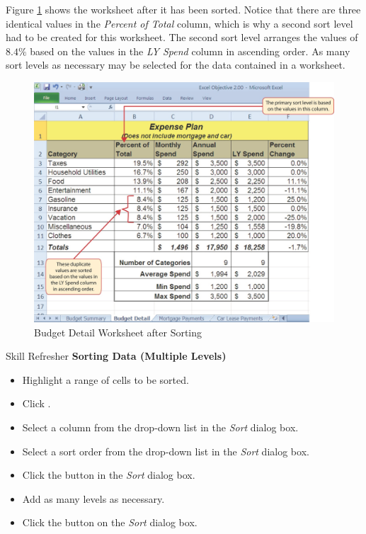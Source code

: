 Figure \ref{02:fig28} shows the  worksheet after it has been sorted. Notice that there are three identical values in the \textit{Percent of Total} column, which is why a second sort level had to be created for this worksheet. The second sort level arranges the values of $ 8.4\% $ based on the values in the \textit{LY Spend} column in ascending order. As many sort levels as necessary may be selected for the data contained in a worksheet.

\begin{figure}[H]
	\centering
	\includegraphics[width=\maxwidth{.95\linewidth}]{gfx/ch02_fig28}
	\caption{Budget Detail Worksheet after Sorting}
	\label{02:fig28}
\end{figure}

\begin{center}
	\begin{sklbox}{Skill Refresher}
		\textbf{Sorting Data (Multiple Levels)}
		\\
		\begin{itemize}
			\setlength{\itemsep}{0pt}
			\setlength{\parskip}{0pt}
			\setlength{\parsep}{0pt}
			
			\item Highlight a range of cells to be sorted.
			\item Click .
			\item Select a column from the  drop-down list in the \textit{Sort} dialog box.
			\item Select a sort order from the  drop-down list in the \textit{Sort} dialog box.
			\item Click the  button in the \textit{Sort} dialog box.
			\item Add as many levels as necessary.
			\item Click the  button on the \textit{Sort} dialog box.
			
		\end{itemize}
	\end{sklbox}
\end{center}

